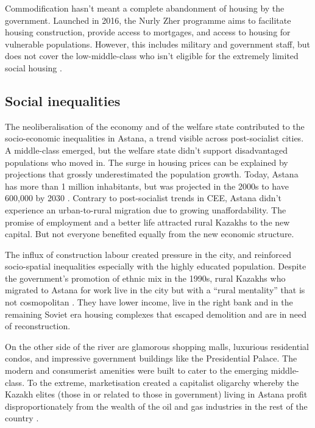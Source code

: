 \documentclass{article}
\begin{document}
Commodification hasn't meant a complete abandonment of housing by the government. Launched in 2016, the Nurly Zher programme aims to facilitate housing construction, provide access to mortgages, and access to housing for vulnerable populations. However, this includes military and government staff, but does not cover the low-middle-class who isn't eligible for the extremely limited social housing \parencite{unece2018housing}.

\subsection{Social inequalities}

The neoliberalisation of the economy and of the welfare state contributed to the socio-economic inequalities in Astana, a trend visible across post-socialist cities. A middle-class emerged, but the welfare state didn't support disadvantaged populations who moved in. The surge in housing prices can be explained by projections that grossly underestimated the population growth. Today, Astana has more than 1 million inhabitants, but was projected in the 2000s to have 600,000 by 2030 \parencite{masterplan2001}. Contrary to post-socialist trends in CEE, Astana didn't experience an urban-to-rural migration due to growing unaffordability. The promise of employment and a better life attracted rural Kazakhs to the new capital. But not everyone benefited equally from the new economic structure.

The influx of construction labour created pressure in the city, and reinforced socio-spatial inequalities especially with the highly educated population.
Despite the government's promotion of ethnic mix in the 1990s, rural Kazakhs who migrated to Astana for work live in the city but with a ``rural mentality'' that is not cosmopolitan \parencite{koch2014bordering}. They have lower income, live in the right bank and in the remaining Soviet era housing complexes that escaped demolition and are in need of reconstruction.

On the other side of the river are glamorous shopping malls, luxurious residential condos, and impressive government buildings like the Presidential Palace. The modern and consumerist amenities were built to cater to the emerging middle-class. To the extreme, marketisation created a capitalist oligarchy whereby the Kazakh elites (those in or related to those in government) living in Astana profit disproportionately from the wealth of the oil and gas industries in the rest of the country \parencite{gallo2021three}.
\end{document}
